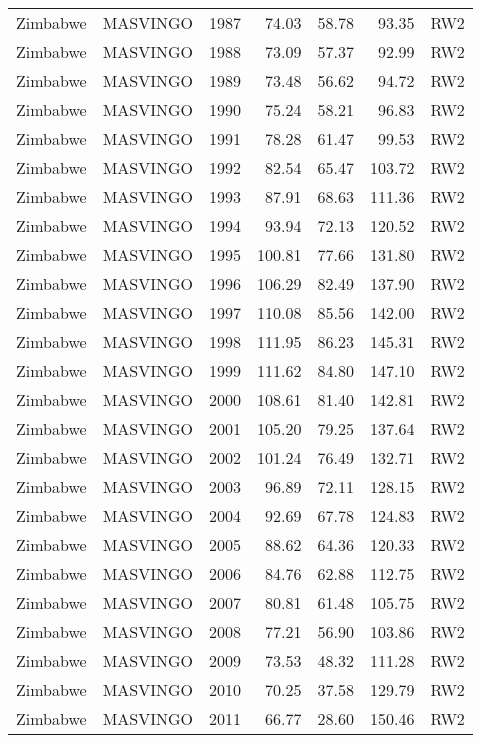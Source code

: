 \begin{longtable}{lllrrrl}
  Zimbabwe & MASVINGO & 1987 & 74.03 & 58.78 & 93.35 & RW2 \\ 
  Zimbabwe & MASVINGO & 1988 & 73.09 & 57.37 & 92.99 & RW2 \\ 
  Zimbabwe & MASVINGO & 1989 & 73.48 & 56.62 & 94.72 & RW2 \\ 
  Zimbabwe & MASVINGO & 1990 & 75.24 & 58.21 & 96.83 & RW2 \\ 
  Zimbabwe & MASVINGO & 1991 & 78.28 & 61.47 & 99.53 & RW2 \\ 
  Zimbabwe & MASVINGO & 1992 & 82.54 & 65.47 & 103.72 & RW2 \\ 
  Zimbabwe & MASVINGO & 1993 & 87.91 & 68.63 & 111.36 & RW2 \\ 
  Zimbabwe & MASVINGO & 1994 & 93.94 & 72.13 & 120.52 & RW2 \\ 
  Zimbabwe & MASVINGO & 1995 & 100.81 & 77.66 & 131.80 & RW2 \\ 
  Zimbabwe & MASVINGO & 1996 & 106.29 & 82.49 & 137.90 & RW2 \\ 
  Zimbabwe & MASVINGO & 1997 & 110.08 & 85.56 & 142.00 & RW2 \\ 
  Zimbabwe & MASVINGO & 1998 & 111.95 & 86.23 & 145.31 & RW2 \\ 
  Zimbabwe & MASVINGO & 1999 & 111.62 & 84.80 & 147.10 & RW2 \\ 
  Zimbabwe & MASVINGO & 2000 & 108.61 & 81.40 & 142.81 & RW2 \\ 
  Zimbabwe & MASVINGO & 2001 & 105.20 & 79.25 & 137.64 & RW2 \\ 
  Zimbabwe & MASVINGO & 2002 & 101.24 & 76.49 & 132.71 & RW2 \\ 
  Zimbabwe & MASVINGO & 2003 & 96.89 & 72.11 & 128.15 & RW2 \\ 
  Zimbabwe & MASVINGO & 2004 & 92.69 & 67.78 & 124.83 & RW2 \\ 
  Zimbabwe & MASVINGO & 2005 & 88.62 & 64.36 & 120.33 & RW2 \\ 
  Zimbabwe & MASVINGO & 2006 & 84.76 & 62.88 & 112.75 & RW2 \\ 
  Zimbabwe & MASVINGO & 2007 & 80.81 & 61.48 & 105.75 & RW2 \\ 
  Zimbabwe & MASVINGO & 2008 & 77.21 & 56.90 & 103.86 & RW2 \\ 
  Zimbabwe & MASVINGO & 2009 & 73.53 & 48.32 & 111.28 & RW2 \\ 
  Zimbabwe & MASVINGO & 2010 & 70.25 & 37.58 & 129.79 & RW2 \\ 
  Zimbabwe & MASVINGO & 2011 & 66.77 & 28.60 & 150.46 & RW2 \\ 

\end{longtable}
